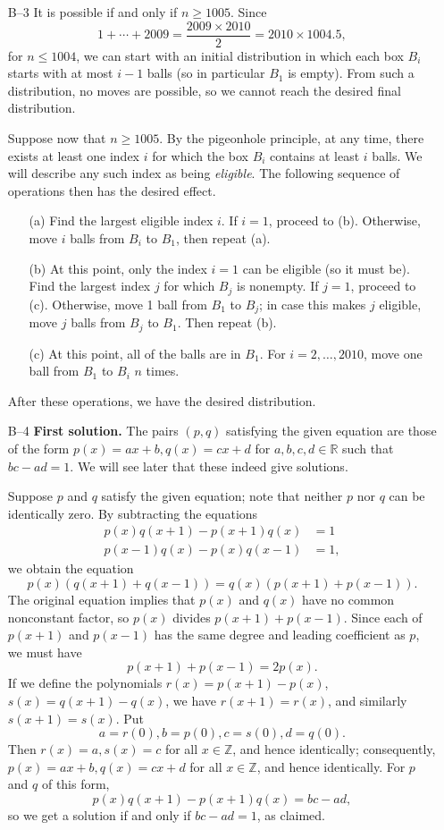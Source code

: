 \documentclass[amssymb,twocolumn,pra,10pt,aps]{revtex4-1}
\newcommand{\RR}{\mathbb{R}}
\newcommand{\ZZ}{\mathbb{Z}}
\begin{document}
\begin{itemize}
\item[B--3]
It is possible if and only if $n \geq 1005$.
Since
\[
1 + \cdots + 2009 = \frac{2009 \times 2010}{2} = 2010 \times 1004.5,
\]
for $n \leq 1004$, we can start with an initial distribution in which each box
$B_i$ starts with at most $i-1$ balls (so in particular $B_1$ is empty).
From such a distribution, no moves are possible, so
we cannot reach the desired final distribution.

Suppose now that $n \geq 1005$.
By the pigeonhole principle, at any time, there exists at least one index $i$ for which the box $B_i$
contains at least $i$ balls. We will describe any such index as being \emph{eligible}.
The following sequence of operations then has the desired effect.
\begin{itemize}
\item[(a)]
Find the largest eligible index $i$.
If $i=1$, proceed to (b).
Otherwise, move $i$ balls from $B_i$ to $B_1$, then repeat (a).
\item[(b)]
At this point, only the index $i=1$ can be eligible (so it must be).
Find the largest index $j$ for which $B_j$ is nonempty.
If $j=1$, proceed to (c).
Otherwise, move 1 ball from $B_1$ to $B_j$; in case this makes $j$ eligible,
move $j$ balls from $B_j$ to $B_1$. Then repeat (b).
\item[(c)]
At this point, all of the balls are in $B_1$. For $i=2,\dots,2010$,
move one ball from $B_1$ to $B_i$ $n$ times.
\end{itemize}
After these operations, we have the desired distribution.

\item[B--4]
\textbf{First solution.}
The pairs $(p,q)$ satisfying the given equation are those of the form $p(x) = ax+b, q(x) = cx+d$
for $a,b,c,d \in \RR$ such that $bc- ad = 1$. We will see later that these indeed give solutions.

Suppose $p$ and $q$ satisfy the given equation; note that neither $p$ nor $q$ can be identically zero.
By subtracting the equations
\begin{align*}
p(x) q(x+1) - p(x+1) q(x) &= 1 \\
p(x-1) q(x) - p(x) q(x-1) &= 1,
\end{align*}
we obtain the equation
\[
p(x) (q(x+1) + q(x-1)) = q(x) (p(x+1) + p(x-1)).
\]
The original equation implies that $p(x)$ and $q(x)$ have no common nonconstant factor,
so $p(x)$ divides $p(x+1) + p(x-1)$. Since each of $p(x+1)$ and $p(x-1)$ has the same degree and leading
coefficient as $p$, we must have
\[
p(x+1) + p(x-1) = 2p(x).
\]
If we define the polynomials $r(x) = p(x+1) - p(x)$, $s(x) = q(x+1) - q(x)$,
we have $r(x+1) = r(x)$, and similarly $s(x+1) = s(x)$.
Put
\[
a = r(0), b = p(0), c = s(0), d = q(0).
\]
Then $r(x) = a, s(x) = c$ for all $x \in \ZZ$, and hence identically;
consequently, $p(x) = ax + b, q(x) = cx + d$ for all $x \in \ZZ$, and hence identically.
For $p$ and $q$ of this form,
\[
p(x) q(x+1) - p(x+1) q(x) = bc - ad,
\]
so we get a solution if and only if $bc-ad=1$, as claimed.


\end{itemize}
\end{document}
